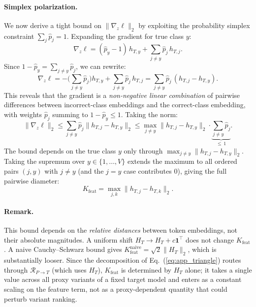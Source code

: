 \paragraph{Simplex polarization.}
We now derive a tight bound on $\|\nabla_z \ell\|_2$ by exploiting the probability simplex constraint $\sum_j \hat{p}_j = 1$. Expanding the gradient for true class $y$:
\begin{equation}
\nabla_z \ell = (\hat{p}_y - 1)\, h_{T,y} + \sum_{j \neq y} \hat{p}_j\, h_{T,j}.
\end{equation}
Since $1 - \hat{p}_y = \sum_{j \neq y} \hat{p}_j$, we can rewrite:
\begin{equation}
\nabla_z \ell = -\Big(\sum_{j \neq y} \hat{p}_j\Big) h_{T,y} + \sum_{j \neq y} \hat{p}_j\, h_{T,j} = \sum_{j \neq y} \hat{p}_j\, (h_{T,j} - h_{T,y}).
\end{equation}
This reveals that the gradient is a \emph{non-negative linear combination} of pairwise differences between incorrect-class embeddings and the correct-class embedding, with weights $\hat{p}_j$ summing to $1 - \hat{p}_y \le 1$. Taking the norm:
\begin{equation}
\|\nabla_z \ell\|_2 \le \sum_{j \neq y} \hat{p}_j \|h_{T,j} - h_{T,y}\|_2 \le \max_{j \neq y} \|h_{T,j} - h_{T,y}\|_2 \cdot \underbrace{\sum_{j \neq y} \hat{p}_j}_{\le\, 1}.
\end{equation}
The bound depends on the true class $y$ only through $\max_{j \neq y} \|h_{T,j} - h_{T,y}\|_2$. Taking the supremum over $y \in \{1,\ldots,V\}$ extends the maximum to all ordered pairs $(j,y)$ with $j\neq y$ (and the $j=y$ case contributes $0$), giving the full pairwise diameter:
\begin{equation}
\label{eq:kfeat_tight}
K_{\mathrm{feat}} = \max_{j,k} \|h_{T,j} - h_{T,k}\|_2.
\end{equation}

\paragraph{Remark.} This bound depends on the \emph{relative distances} between token embeddings, not their absolute magnitudes. A uniform shift $H_T \to H_T + c\mathbf{1}^\top$ does not change $K_{\mathrm{feat}}$. A naive Cauchy--Schwarz bound gives $K_{\mathrm{feat}}^{\mathrm{naive}} = \sqrt{2}\|H_T\|_2$, which is substantially looser. Since the decomposition of Eq.~(\ref{eq:app_triangle}) routes through $\mathcal{R}_{P\to T}$ (which uses $H_T$), $K_{\mathrm{feat}}$ is determined by $H_T$ alone; it takes a single value across all proxy variants of a fixed target model and enters as a constant scaling on the feature term, not as a proxy-dependent quantity that could perturb variant ranking.

